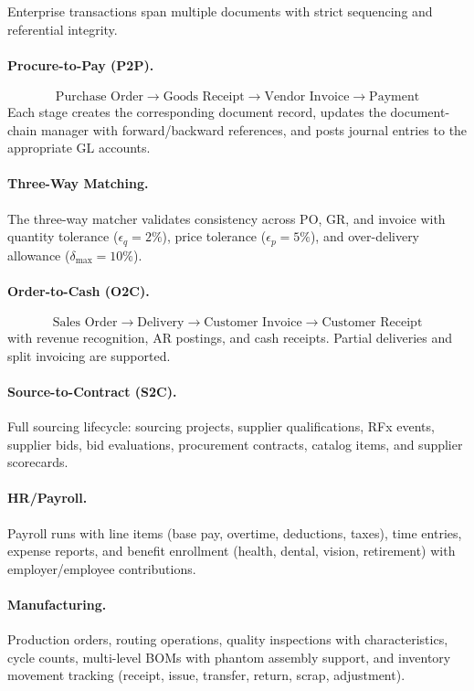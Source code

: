 Enterprise transactions span multiple documents with strict sequencing
and referential integrity.

\paragraph{Procure-to-Pay (P2P).}
\[
\text{Purchase Order} \to \text{Goods Receipt} \to \text{Vendor Invoice}
\to \text{Payment}
\]
Each stage creates the corresponding document record, updates the
document-chain manager with forward/backward references, and posts
journal entries to the appropriate GL accounts.

\paragraph{Three-Way Matching.}
The three-way matcher validates consistency across PO, GR, and invoice
with quantity tolerance ($\epsilon_q = 2\%$), price tolerance
($\epsilon_p = 5\%$), and over-delivery allowance ($\delta_{\max} = 10\%$).

\paragraph{Order-to-Cash (O2C).}
\[
\text{Sales Order} \to \text{Delivery} \to \text{Customer Invoice}
\to \text{Customer Receipt}
\]
with revenue recognition, AR postings, and cash receipts.  Partial
deliveries and split invoicing are supported.

\paragraph{Source-to-Contract (S2C).}
Full sourcing lifecycle: sourcing projects, supplier qualifications,
RFx events, supplier bids, bid evaluations, procurement contracts,
catalog items, and supplier scorecards.

\paragraph{HR/Payroll.}
Payroll runs with line items (base pay, overtime, deductions, taxes),
time entries, expense reports, and benefit enrollment (health, dental,
vision, retirement) with employer/employee contributions.

\paragraph{Manufacturing.}
Production orders, routing operations, quality inspections with
characteristics, cycle counts, multi-level BOMs with phantom assembly
support, and inventory movement tracking (receipt, issue, transfer,
return, scrap, adjustment).

